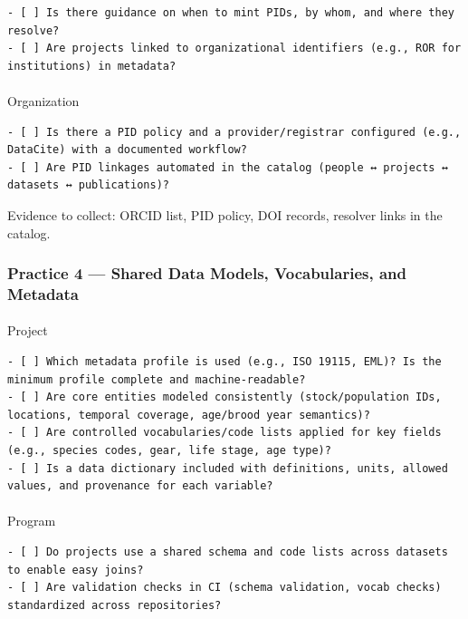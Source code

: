 \documentclass[
  letterpaper,
  DIV=11,
  numbers=noendperiod]{scrartcl}
\makeatletter
\let\oldparagraph\paragraph
\renewcommand{\paragraph}{
    \@ifstar
      \xxxParagraphStar
      \xxxParagraphNoStar
  }
\newcommand{\xxxParagraphStar}[1]{\oldparagraph*{#1}\mbox{}}
\newcommand{\xxxParagraphNoStar}[1]{\oldparagraph{#1}\mbox{}}
\makeatother
\begin{document}
\begin{verbatim}
- [ ] Is there guidance on when to mint PIDs, by whom, and where they resolve?
- [ ] Are projects linked to organizational identifiers (e.g., ROR for institutions) in metadata?
\end{verbatim}

\paragraph{Organization}\label{organization-2}

\begin{verbatim}
- [ ] Is there a PID policy and a provider/registrar configured (e.g., DataCite) with a documented workflow?
- [ ] Are PID linkages automated in the catalog (people ↔ projects ↔ datasets ↔ publications)?
\end{verbatim}

Evidence to collect: ORCID list, PID policy, DOI records, resolver links
in the catalog.

\subsubsection{Practice 4 --- Shared Data Models, Vocabularies, and
Metadata}\label{practice-4-shared-data-models-vocabularies-and-metadata}

\paragraph{Project}\label{project-3}

\begin{verbatim}
- [ ] Which metadata profile is used (e.g., ISO 19115, EML)? Is the minimum profile complete and machine‑readable?
- [ ] Are core entities modeled consistently (stock/population IDs, locations, temporal coverage, age/brood year semantics)?
- [ ] Are controlled vocabularies/code lists applied for key fields (e.g., species codes, gear, life stage, age type)?
- [ ] Is a data dictionary included with definitions, units, allowed values, and provenance for each variable?
\end{verbatim}

\paragraph{Program}\label{program-3}

\begin{verbatim}
- [ ] Do projects use a shared schema and code lists across datasets to enable easy joins?
- [ ] Are validation checks in CI (schema validation, vocab checks) standardized across repositories?
\end{verbatim}
\end{document}
